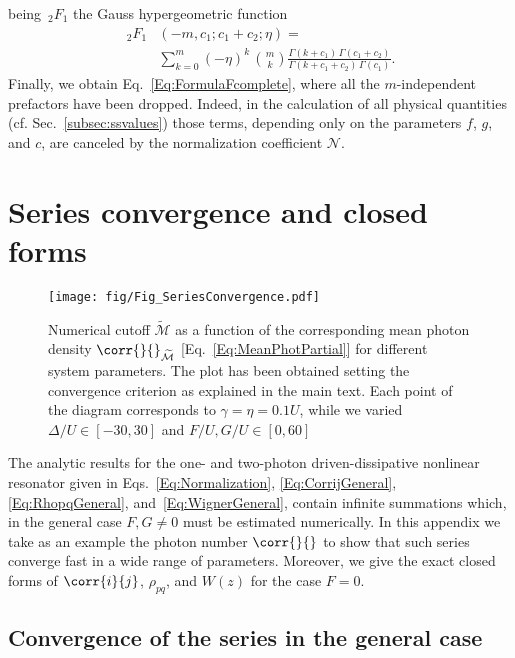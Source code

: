 being $\,_2 F_1$ the Gauss hypergeometric function
\begin{align}
\,_2F_1&\left(-m,c_1;c_1+c_2;\eta\right)=\nonumber\\
&\sum_{k=0}^{m} \left(-\eta\right)^k\, \binom{m}{k}
\frac{\Gamma\left(k+c_1\right)\,\Gamma\left(c_1+c_2\right)}
{\Gamma\left(k+c_1+c_2\right)\,\Gamma\left(c_1\right)}.
\end{align}
Finally, we obtain Eq.~\eqref{Eq:FormulaFcomplete},
where all the $m$-independent prefactors have been dropped.
Indeed, in the calculation of all physical quantities (cf. Sec.~\ref{subsec:ssvalues}) those terms, depending only on the parameters $f$, $g$, and $c$, are canceled by the normalization coefficient ${\mathcal{N}}$.

\section{Series convergence and closed forms}

\begin{figure}[h]
	\texttt{[image: fig/Fig\_SeriesConvergence.pdf]}
	\caption{Numerical cutoff $\widetilde{\mathcal{M}}$ as a function of the corresponding mean photon density $\corr{}{}_{\widetilde{\mathcal{M}}}$ [Eq.~\eqref{Eq:MeanPhotPartial}] for different system parameters.
		The plot has been obtained setting the convergence criterion as explained in the main text.
		Each point of the diagram corresponds to $\gamma=\eta=0.1 U$, while we varied $\Delta/U\in[-30,30]$ and $F/U,G/U\in[0,60]$}
	\label{Fig:Convergence}
\end{figure}


The analytic results for the one- and two-photon driven-dissipative nonlinear resonator given in Eqs.~\eqref{Eq:Normalization}, \eqref{Eq:CorrijGeneral}, \eqref{Eq:RhopqGeneral}, and~\eqref{Eq:WignerGeneral}, contain infinite summations which, in the general case $F,G\neq0$ must be estimated numerically.
In this appendix we take as an example the photon number $\corr{}{}$ to show that such series converge fast in a wide range of parameters.
Moreover, we give the exact closed forms of $\corr{i}{j}$, $\rho_{pq}$, and $W(z)$ for the case $F=0$.

\subsection{Convergence of the series in the general case}\label{Subsec:Convergence}


